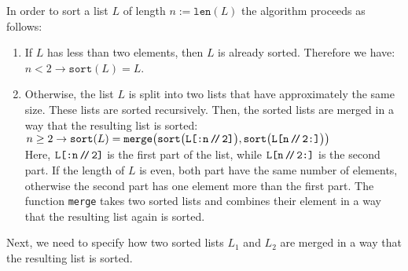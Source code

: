 In order to sort a list $L$ of length $n := \texttt{len}(L)$ the algorithm proceeds as follows:
\begin{enumerate}
\item If $L$ has less than two elements, then $L$ is already sorted.  Therefore we have: 
      \\[0.2cm]
      \hspace*{1.3cm}
      $n < 2 \rightarrow \mathtt{sort}(L) = L$.
\item Otherwise, the list $L$ is split into two lists that have approximately the same size.
      These lists are sorted recursively.  Then, the sorted lists are merged in a way that the
      resulting list is sorted: \\[0.2cm]
      \hspace*{1.3cm} 
      $n \geq 2 \rightarrow \mathtt{sort}(L) =
         \mathtt{merge}\bigl(\mathtt{sort}\bigl(\texttt{L[:n\mbox{\,\texttt{/}$\!$\texttt{/}\,}2]}\bigr),
         \mathtt{sort}\bigl(\texttt{L[n\mbox{\,\texttt{/}$\!$\texttt{/}\,}2:]}\bigr)\bigr)
     $
     \\[0.2cm]
     Here,  $\texttt{L[:n\mbox{\,\texttt{/}$\!$\texttt{/}\,}2]}$ is the first part of the list, while
     $\texttt{L[n\mbox{\,\texttt{/}$\!$\texttt{/}\,}2:]}$ is the second part.  If the length of $L$ is even, both part have the same number of
     elements, otherwise the second part has one element more than the first part.  The function \texttt{merge}
     takes two sorted lists and combines their element in a way that the resulting list again is sorted.
\end{enumerate}
Next, we need to specify how two sorted lists $L_1$ and $L_2$ are merged in a way that the resulting list
is sorted.
